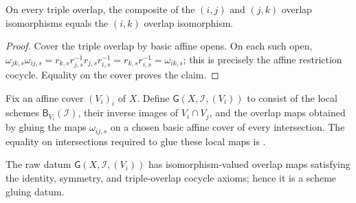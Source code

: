 \begin{lemma}
  \label{lemma:nagata-global-blowup-overlap-cocycle}
  \leanok

  On every triple overlap, the composite of the $(i,j)$ and $(j,k)$ overlap
  isomorphisms equals the $(i,k)$ overlap isomorphism.
\end{lemma}

\begin{proof}
  \leanok
  Cover the triple overlap by basic affine opens.  On each such open,
  $\omega_{jk,s}\omega_{ij,s}=r_{k,s}r_{j,s}^{-1}r_{j,s}r_{i,s}^{-1}
  =r_{k,s}r_{i,s}^{-1}=\omega_{ik,s}$; this is precisely the affine
  restriction cocycle.  Equality on the cover proves the claim.
\end{proof}

\begin{definition}
  \label{def:nagata-global-blowup-glue-data}
  \leanok

  Fix an affine cover $(V_i)_i$ of $X$.  Define
  $\mathsf G(X,\mathcal I,(V_i))$ to consist of the local schemes
  $\mathsf B_{V_i}(\mathcal I)$, their inverse images of $V_i\cap V_j$, and
  the overlap maps obtained by gluing the maps $\omega_{ij,s}$ on a chosen
  basic affine cover of every intersection.  The equality on intersections
  required to glue these local maps is
  .
\end{definition}

\begin{lemma}
  \label{lemma:nagata-global-blowup-glue-data-valid}
  \leanok

  The raw datum $\mathsf G(X,\mathcal I,(V_i))$ has isomorphism-valued
  overlap maps satisfying the identity, symmetry, and triple-overlap cocycle
  axioms; hence it is a scheme gluing datum.
\end{lemma}

